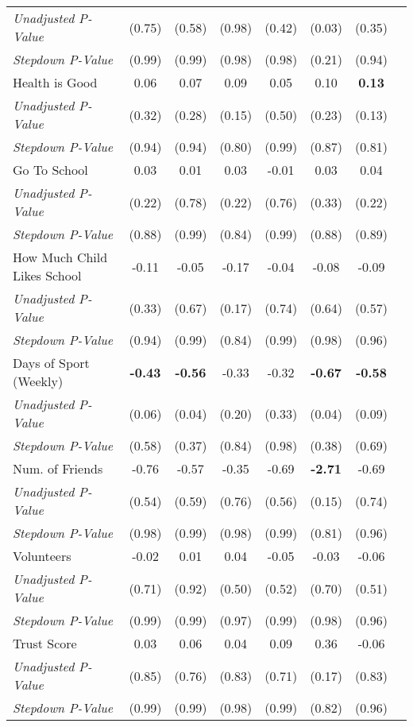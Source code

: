 \begin{tabular}{l c c c c c c c}
\quad \textit{Unadjusted P-Value} & (0.75) & (0.58) & (0.98) & (0.42) & (0.03) & (0.35) \\
\quad \textit{Stepdown P-Value} & (0.99) & (0.99) & (0.98) & (0.98) & (0.21) & (0.94) \\
Health is Good & 0.06 & 0.07 & 0.09 & 0.05 & 0.10 & \textbf{ 0.13 } \\
\quad \textit{Unadjusted P-Value} & (0.32) & (0.28) & (0.15) & (0.50) & (0.23) & (0.13) \\
\quad \textit{Stepdown P-Value} & (0.94) & (0.94) & (0.80) & (0.99) & (0.87) & (0.81) \\
Go To School & 0.03 & 0.01 & 0.03 & -0.01 & 0.03 & 0.04 \\
\quad \textit{Unadjusted P-Value} & (0.22) & (0.78) & (0.22) & (0.76) & (0.33) & (0.22) \\
\quad \textit{Stepdown P-Value} & (0.88) & (0.99) & (0.84) & (0.99) & (0.88) & (0.89) \\
How Much Child Likes School & -0.11 & -0.05 & -0.17 & -0.04 & -0.08 & -0.09 \\
\quad \textit{Unadjusted P-Value} & (0.33) & (0.67) & (0.17) & (0.74) & (0.64) & (0.57) \\
\quad \textit{Stepdown P-Value} & (0.94) & (0.99) & (0.84) & (0.99) & (0.98) & (0.96) \\
Days of Sport (Weekly) & \textbf{ -0.43 } & \textbf{ -0.56 } & -0.33 & -0.32 & \textbf{ -0.67 } & \textbf{ -0.58 } \\
\quad \textit{Unadjusted P-Value} & (0.06) & (0.04) & (0.20) & (0.33) & (0.04) & (0.09) \\
\quad \textit{Stepdown P-Value} & (0.58) & (0.37) & (0.84) & (0.98) & (0.38) & (0.69) \\
Num. of Friends & -0.76 & -0.57 & -0.35 & -0.69 & \textbf{ -2.71 } & -0.69 \\
\quad \textit{Unadjusted P-Value} & (0.54) & (0.59) & (0.76) & (0.56) & (0.15) & (0.74) \\
\quad \textit{Stepdown P-Value} & (0.98) & (0.99) & (0.98) & (0.99) & (0.81) & (0.96) \\
Volunteers & -0.02 & 0.01 & 0.04 & -0.05 & -0.03 & -0.06 \\
\quad \textit{Unadjusted P-Value} & (0.71) & (0.92) & (0.50) & (0.52) & (0.70) & (0.51) \\
\quad \textit{Stepdown P-Value} & (0.99) & (0.99) & (0.97) & (0.99) & (0.98) & (0.96) \\
Trust Score & 0.03 & 0.06 & 0.04 & 0.09 & 0.36 & -0.06 \\
\quad \textit{Unadjusted P-Value} & (0.85) & (0.76) & (0.83) & (0.71) & (0.17) & (0.83) \\
\quad \textit{Stepdown P-Value} & (0.99) & (0.99) & (0.98) & (0.99) & (0.82) & (0.96) \\
\bottomrule
\end{tabular}

